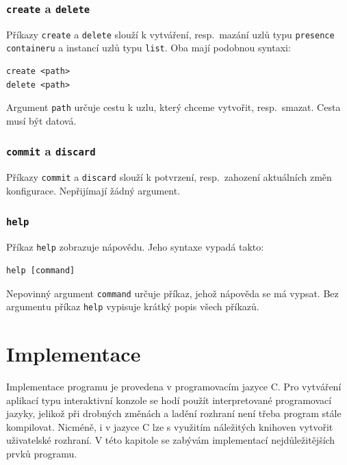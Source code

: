 \documentclass[thesis=B,czech,hidelinks]{FITthesis}[2019/03/06]
\newcommand{\Rplus}{\protect\hspace{-.1em}\protect\raisebox{.35ex}{\smaller{\smaller\textbf{+}}}}
\newcommand{\Cpp}{\mbox{C\Rplus\Rplus}\xspace}
\begin{document}
\subsection{\texttt{create} a \texttt{delete}}
Příkazy \texttt{create} a \texttt{delete} slouží k vytváření, resp.\ mazání uzlů typu \texttt{presence containeru} a instancí uzlů typu \texttt{list}. Oba mají podobnou syntaxi:
\begin{verbatim}
create <path>
delete <path>
\end{verbatim}
Argument \texttt{path} určuje cestu k uzlu, který chceme vytvořit, resp.\ smazat. Cesta musí být datová.
\subsection{\texttt{commit} a \texttt{discard}}
Příkazy \texttt{commit} a \texttt{discard} slouží k potvrzení, resp.\ zahození aktuálních změn konfigurace. Nepřijímají žádný argument.
\subsection{\texttt{help}}
Příkaz \texttt{help} zobrazuje nápovědu. Jeho syntaxe vypadá takto:
\begin{verbatim}
help [command]
\end{verbatim}
Nepovinný argument \texttt{command} určuje příkaz, jehož nápověda se má vypsat. Bez argumentu příkaz \texttt{help} vypisuje krátký popis všech příkazů.


\chapter{Implementace}
Implementace programu je provedena v programovacím jazyce \Cpp{}. Pro vytváření aplikací typu interaktivní konzole se hodí použít interpretované programovací jazyky, jelikož při drobných změnách a ladění rozhraní není třeba program stále kompilovat. Nicméně, i v jazyce \Cpp{} lze s využitím náležitých knihoven vytvořit uživatelské rozhraní. V této kapitole se zabývám implementací nejdůležitějších prvků programu.
\end{document}
